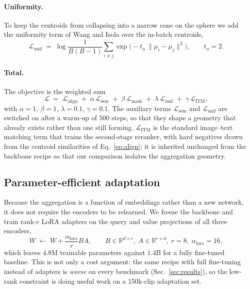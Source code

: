 \paragraph{Uniformity.}
To keep the centroids from collapsing into a narrow cone on the sphere we add the
uniformity term of Wang and Isola over the in-batch centroids,
\begin{equation}
  \mathcal{L}_{\mathrm{unif}} \;=\;
  \log \frac{1}{B(B-1)} \sum_{i \neq j} \exp\bigl(-t_u \, \|\mu_i - \mu_j\|^2\bigr),
  \qquad t_u = 2 .
  \label{eq:lunif}
\end{equation}

\paragraph{Total.}
The objective is the weighted sum
\begin{equation}
  \mathcal{L} \;=\; \mathcal{L}_{\mathrm{align}}
  \;+\; \alpha\,\mathcal{L}_{\mathrm{sem}}
  \;+\; \beta\,\mathcal{L}_{\mathrm{mask}}
  \;+\; \lambda\,\mathcal{L}_{\mathrm{unif}}
  \;+\; \gamma\,\mathcal{L}_{\mathrm{ITM}},
  \label{eq:total}
\end{equation}
with $\alpha = 1$, $\beta = 1$, $\lambda = 0.1$, $\gamma = 0.1$. The auxiliary terms
$\mathcal{L}_{\mathrm{sem}}$ and $\mathcal{L}_{\mathrm{unif}}$ are switched on after a
warm-up of $500$ steps, so that they shape a geometry that already exists rather than
one still forming. $\mathcal{L}_{\mathrm{ITM}}$ is the standard image--text matching
term that trains the second-stage reranker, with hard negatives drawn from the
centroid similarities of Eq.~\eqref{eq:align}; it is inherited unchanged from the
backbone recipe so that our comparison isolates the aggregation geometry.

\subsection{Parameter-efficient adaptation}

Because the aggregation is a function of embeddings rather than a new network, it
does not require the encoders to be relearned. We freeze the backbone and train
rank-$r$ LoRA adapters on the query and value projections of all three encoders,
\begin{equation}
  W \;\leftarrow\; W + \frac{\alpha_{\mathrm{lora}}}{r} B A,
  \qquad B \in \mathbb{R}^{d \times r},\; A \in \mathbb{R}^{r \times d},\;
  r = 8,\; \alpha_{\mathrm{lora}} = 16 ,
  \label{eq:lora}
\end{equation}
which leaves $4.8$M trainable parameters against $1.4$B for a fully fine-tuned
baseline. This is not only a cost argument: the same recipe with full fine-tuning
instead of adapters is \emph{worse} on every benchmark (Sec.~\ref{sec:results}), so
the low-rank constraint is doing useful work on a $150$k-clip adaptation set.

